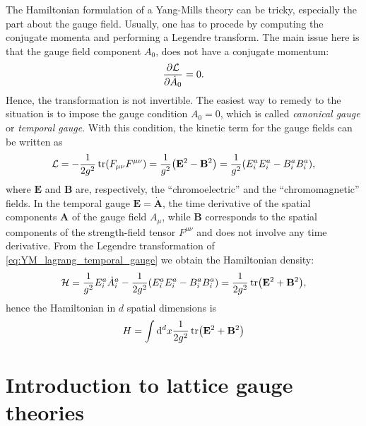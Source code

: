 \documentclass{book}
\begin{document}
The Hamiltonian formulation of a Yang-Mills theory can be tricky, especially the part about the gauge field.
Usually, one has to procede by computing the conjugate momenta and performing a Legendre transform.
The main issue here is that the gauge field component $A_0$, does not have a conjugate momentum:
\begin{equation}
    \pdv{\mathcal{L}}{\dot{A}_0} = 0.
\end{equation}
Hence, the transformation is not invertible.
The easiest way to remedy to the situation is to impose the gauge condition $A_0 = 0$,
which is called \emph{canonical gauge} or \emph{temporal gauge}.
With this condition, the kinetic term for the gauge fields can be written as
\begin{equation}
    \mathcal{L}
    = - \frac{1}{2 g^2} \tr(F_{\mu \nu} F^{\mu \nu})
    = \frac{1}{g^2} \qty( \mathbf{E}^2 - \mathbf{B}^2 )
    = \frac{1}{g^2} \qty(E^a_i E^a_i - B^a_i B^a_i),
    \label{eq:YM_lagrang_temporal_gauge}
\end{equation}
where $\mathbf{E}$ and $\mathbf{B}$ are, respectively, the ``chromoelectric'' and the ``chromomagnetic'' fields.
In the temporal gauge $\mathbf{E} = \dot{\mathbf{A}}$, the time derivative of the spatial components $\mathbf{A}$ of the gauge field $A_{\mu}$, while $\mathbf{B}$ corresponds to the spatial components of the strength-field tensor $F^{\mu \nu}$ and does not involve any time derivative.
From the Legendre transformation of \eqref{eq:YM_lagrang_temporal_gauge} we obtain the Hamiltonian density:
\begin{equation}
    \mathcal{H}
    = \frac{1}{g^2} E^a_i \dot{A}^a_i - \frac{1}{2 g^2} \qty( E^a_i E^a_i - B^a_i B^a_i )
    = \frac{1}{2g^2} \tr ( \mathbf{E}^2 + \mathbf{B}^2 ),
\end{equation}
hence the Hamiltonian in $d$ spatial dimensions is
\begin{equation}
    H = \int \dd^{d} x \frac{1}{2 g^2} \tr(\mathbf{E}^2 + \mathbf{B}^2)
\end{equation}




\chapter{Introduction to lattice gauge theories}
\label{chap:introduction_to_lattice_gauge_theories}
\end{document}
